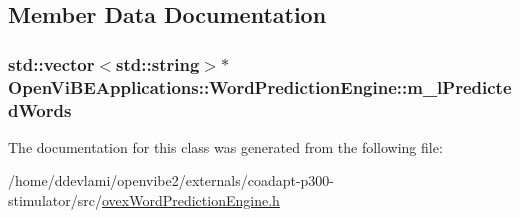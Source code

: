 \subsection{Member Data Documentation}
\hypertarget{classOpenViBEApplications_1_1WordPredictionEngine_a3215eeb57bf7e1fabc9756972940a248}{
\subsubsection[{m\_\-lPredictedWords}]{\setlength{\rightskip}{0pt plus 5cm}std::vector$<$std::string$>$$\ast$ {\bf OpenViBEApplications::WordPredictionEngine::m\_\-lPredictedWords}}}
\label{classOpenViBEApplications_1_1WordPredictionEngine_a3215eeb57bf7e1fabc9756972940a248}


The documentation for this class was generated from the following file:\begin{DoxyCompactItemize}
\item 
/home/ddevlami/openvibe2/externals/coadapt-\/p300-\/stimulator/src/\hyperlink{ovexWordPredictionEngine_8h}{ovexWordPredictionEngine.h}\end{DoxyCompactItemize}
